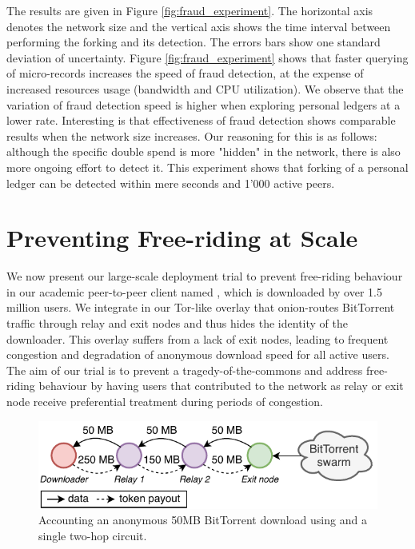 The results are given in Figure \ref{fig:fraud_experiment}.
The horizontal axis denotes the network size and the vertical axis shows the time interval between performing the forking and its detection.
The errors bars show one standard deviation of uncertainty.
Figure \ref{fig:fraud_experiment} shows that faster querying of micro-records increases the speed of fraud detection, at the expense of increased resources usage (bandwidth and CPU utilization).
We observe that the variation of fraud detection speed is higher when exploring personal ledgers at a lower rate.
Interesting is that effectiveness of fraud detection shows comparable results when the network size increases.
Our reasoning for this is as follows: although the specific double spend is more "hidden" in the network, there is also more ongoing effort to detect it.
This experiment shows that forking of a personal ledger can be detected within mere seconds and 1'000 active peers.

\section{Preventing Free-riding at Scale}
\label{sec:deployment}
We now present our large-scale deployment trial to prevent free-riding behaviour in our academic peer-to-peer client named \Tribler{}, which is downloaded by over 1.5 million users.
We integrate \ModelName{} in our Tor-like overlay that onion-routes BitTorrent traffic through relay and exit nodes and thus hides the identity of the downloader.
This overlay suffers from a lack of exit nodes, leading to frequent congestion and degradation of anonymous download speed for all active users.
The aim of our trial is to prevent a tragedy-of-the-commons and address free-riding behaviour by having users that contributed to the network as relay or exit node receive preferential treatment during periods of congestion.

\begin{figure}[t]
	\centering
	\includegraphics[width=\linewidth]{trustchain/assets/payouts}
	\caption{Accounting an anonymous 50MB BitTorrent download using \ModelName{} and a single two-hop circuit.}
	\label{fig:payouts}
\end{figure}

